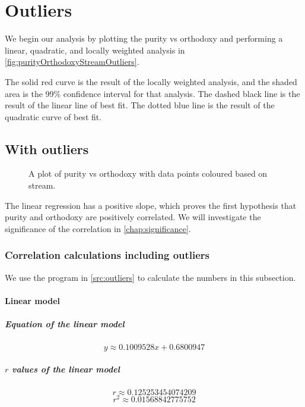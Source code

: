 \chapter{Outliers}\label{chap:outliers}

We begin our analysis by plotting the purity vs orthodoxy and performing a linear, quadratic, and locally weighted analysis in \vref{fig:purityOrthodoxyStreamOutliers}.

The solid red curve is the result of the locally weighted analysis, and the shaded area is the 99\% confidence interval for that analysis.
The dashed black line is the result of the linear line of best fit.
The dotted blue line is the result of the quadratic curve of best fit.

\section{With outliers}
\begin{figure}[H]
	\caption{A plot of purity vs orthodoxy with data points coloured based on stream.}
	\label{fig:purityOrthodoxyStreamOutliers}
\end{figure}

The linear regression has a positive slope, which proves the first hypothesis that purity and orthodoxy are positively correlated.
We will investigate the significance of the correlation in \vref{chap:significance}.

\subsection{Correlation calculations including outliers}
We use the program in \vref{src:outliers} to calculate the numbers in this subsection.

\subsubsection{Linear model}
\paragraph{Equation of the linear model}
\[y \approx 0.1009528x + 0.6800947\]
\paragraph{$r$ values of the linear model}
\[r \approx 0.125253454074209\]
\[r^2 \approx 0.01568842775752\]

